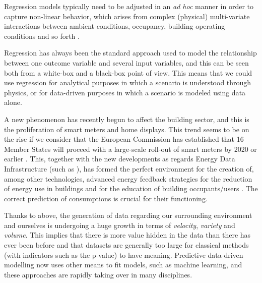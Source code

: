 \documentclass[10pt, conference, compsocconf]{IEEEtran}
\begin{document}
Regression models typically need to be adjusted in an \textit{ad hoc} manner in order to capture non-linear behavior, which arises from complex (physical) multi-variate interactions between ambient conditions, occupancy, building operating conditions and so forth \cite{heo2012gaussian}.


Regression has always been the standard approach used to model the relationship between one outcome variable  and several input variables, and this can be seen both from a white-box and a black-box point of view. This means that we could use regression for analytical purposes in which a scenario is understood through physics, or for data-driven purposes in which a scenario is modeled using data alone. 


A new phenomenon has recently begun to affect the building sector, and this is the proliferation of smart meters and home displays. This trend seems to be on the rise if we consider that the European Commission has established that 16 Member States will proceed with a large-scale roll-out of smart meters by 2020 or earlier \cite{ec2014report}. This, together with the new developments as regards Energy Data Infrastructure (such as \cite{terroso2017open, fotopoulou2017providing}), has formed the perfect environment for the creation of, among other technologies, advanced energy feedback strategies for the reduction of energy use in buildings and for the education of building occupants/users \cite{how2017}. The correct prediction of consumptions is crucial for their functioning.

Thanks to above, the generation of data regarding our surrounding environment and ourselves is undergoing a huge growth in terms of \emph{velocity}, \emph{variety} and \emph{volume}. This implies that there is more value hidden in the data than there has ever been before and that datasets are generally too large for classical methods (with indicators such as the p-value) to have meaning. Predictive data-driven modelling now uses other means to fit models, such as machine learning, and these approaches are rapidly taking over in many disciplines.


\end{document}
